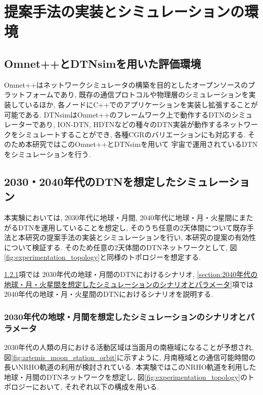 \chapter{提案手法の実装とシミュレーションの環境}
\label{chap:implementation_and_experimentation}

\section{Omnet++とDTNsimを用いた評価環境}
Omnet++はネットワークシミュレータの構築を目的としたオープンソースのプラットフォームであり, 
既存の通信プロトコルや物理層のシミュレーションを実装しているほか, 
各ノードにC++でのアプリケーションを実装し拡張することが可能である. 
DTNsimはOmnet++のフレームワーク上で動作するDTNのシミュレーターであり, 
ION-DTN, HDTNなどの種々のDTN実装が動作するネットワークをシミュレートすることができ, 
各種CGRのバリエーションにも対応する. そのため本研究ではこのOmnet++とDTNsimを用いて
宇宙で運用されているDTNをシミュレーションを行う. 

\section{2030・2040年代のDTNを想定したシミュレーション}
本実験においては, 2030年代に地球・月間, 2040年代に地球・月・火星間にまたがるDTNを運用していることを想定し, 
そのうち任意の2天体間について既存手法と本研究の提案手法の実装とシミュレーションを行い, 
本研究の提案の有効性について検証する. そのため任意の2天体間のDTNネットワークとして, 
図\ref{fig:experimentation_topology}と同様のトポロジーを想定する. 

\ref{section:2030年代の地球・月間を想定したシミュレーションのシナリオとパラメータ}項では
2030年代の地球・月間のDTNにおけるシナリオ, 
\ref{section:2040年代の地球・月・火星間を想定したシミュレーションのシナリオとパラメータ}項では
2040年代の地球・月・火星間のDTNにおけるシナリオを説明する. 

\subsection{2030年代の地球・月間を想定したシミュレーションのシナリオとパラメータ}
\label{section:2030年代の地球・月間を想定したシミュレーションのシナリオとパラメータ}
2030年代の人類の月における活動区域は当面月の南極域になることが予想され, 
図\ref{fig:artemis_moon_station_orbit}に示すように, 
月南極域との通信可能時間の長いNRHO軌道の利用が検討されている. 
本実験ではこのNRHO軌道を利用した地球・月間のDTNネットワークを想定し, 
図\ref{fig:experimentation_topology}のトポロジーにおいて, 
それぞれ以下の構成を用いる. 

